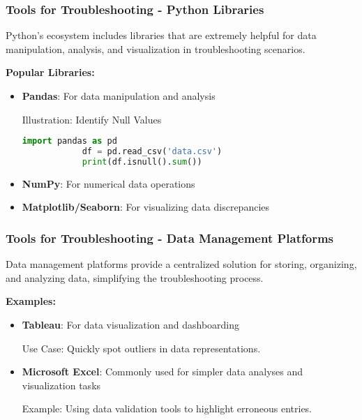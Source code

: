 \documentclass{beamer}
\begin{document}
\begin{frame}[fragile]
    \frametitle{Tools for Troubleshooting - Python Libraries}

    Python's ecosystem includes libraries that are extremely helpful for data manipulation, analysis, and visualization in troubleshooting scenarios.

    \textbf{Popular Libraries:}
    \begin{itemize}
        \item \textbf{Pandas}: For data manipulation and analysis
        \begin{block}{Illustration: Identify Null Values}
            \begin{lstlisting}[language=Python]
            import pandas as pd
            df = pd.read_csv('data.csv')
            print(df.isnull().sum())
            \end{lstlisting}
        \end{block}
        
        \item \textbf{NumPy}: For numerical data operations
        \item \textbf{Matplotlib/Seaborn}: For visualizing data discrepancies
    \end{itemize}
\end{frame}

\begin{frame}[fragile]
    \frametitle{Tools for Troubleshooting - Data Management Platforms}
    
    Data management platforms provide a centralized solution for storing, organizing, and analyzing data, simplifying the troubleshooting process.

    \textbf{Examples:}
    \begin{itemize}
        \item \textbf{Tableau}: For data visualization and dashboarding
        \begin{block}{Use Case:} Quickly spot outliers in data representations. \end{block}
        
        \item \textbf{Microsoft Excel}: Commonly used for simpler data analyses and visualization tasks
        \begin{block}{Example:} Using data validation tools to highlight erroneous entries. \end{block}
    \end{itemize}
\end{frame}
\end{document}
